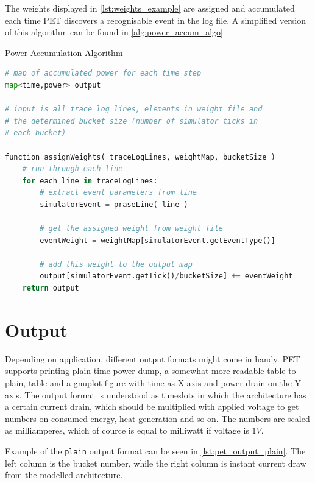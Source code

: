 

The weights displayed in \autoref{lst:weights_example} are assigned and
accumulated each time PET discovers a recognisable event in the log file. A
simplified version of this algorithm can be found in
\autoref{alg:power_accum_algo}

\begin{algorithm}
\caption{Power Accumulation Algorithm}
\label{alg:power_accum_algo}
\begin{lstlisting}[language=Python]
# map of accumulated power for each time step
map<time,power> output

# input is all trace log lines, elements in weight file and
# the determined bucket size (number of simulator ticks in
# each bucket)

function assignWeights( traceLogLines, weightMap, bucketSize )
    # run through each line
    for each line in traceLogLines:
        # extract event parameters from line
        simulatorEvent = praseLine( line )

        # get the assigned weight from weight file
        eventWeight = weightMap[simulatorEvent.getEventType()]

        # add this weight to the output map
        output[simulatorEvent.getTick()/bucketSize] += eventWeight
    return output
\end{lstlisting}
\end{algorithm}
%

\section{Output}
Depending on application, different output formats might come in handy. PET
supports printing plain time power dump, a somewhat more readable table to
plain, table and a gnuplot figure with time as X-axis and power drain on the
Y-axis. The output format is understood as timeslots in which the architecture
has a certain current drain, which should be multiplied with applied voltage to
get numbers on consumed energy, heat generation and so on. The numbers are
scaled as milliamperes, which of cource is equal to milliwatt if voltage is
$1V$.

Example of the \texttt{plain} output format can be seen in
\autoref{lst:pet_output_plain}. The left column is the bucket number, while the
right column is instant current draw from the modelled architecture.

